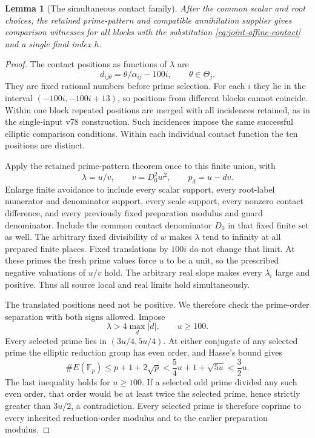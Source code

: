 \documentclass[11pt]{article}
\newtheorem{lemma}[theorem]{Lemma}
\begin{document}
\begin{lemma}[The simultaneous contact family]
\label{lem:joint-few-contacts}
After the common scalar and root choices, the retained prime-pattern
and compatible annihilation supplier gives comparison witnesses
for all blocks with the substitution
\eqref{eq:joint-affine-contact} and a single final index $h$.
\end{lemma}
\begin{proof}
The contact positions as functions of $\lambda$ are
\[
                d_{ij\theta}=\theta/\alpha_{ij}-100i,
                            \qquad \theta\in\Theta_j.
\]
They are fixed rational numbers before prime selection.  For each
$i$ they lie in the interval $(-100i,-100i+13)$, so positions from
different blocks cannot coincide.  Within one block repeated
positions are merged with all incidences retained, as in the
single-input v78 construction.  Such incidences impose the same
successful elliptic comparison conditions.  Within each individual
contact function the ten positions are distinct.

Apply the retained prime-pattern theorem once to this finite
union, with
\[
                  \lambda=u/v,\qquad v=D_0^2w^2,
                  \qquad p_d=u-dv.
\]
Enlarge finite avoidance to include every scalar support, every
root-label numerator and denominator support, every scale support,
every nonzero contact difference, and every previously fixed
preparation modulus and guard denominator.  Include the common
contact denominator $D_0$ in that fixed finite set as well.  The
arbitrary fixed divisibility of $w$ makes $\lambda$ tend to infinity at all prepared
finite places.  Fixed translations by $100i$ do not change that
limit.  At these primes the fresh prime values force $u$ to be a
unit, so the prescribed negative valuations of $u/v$ hold.
The arbitrary real slope makes every $\lambda_i$ large
and positive.  Thus all source local and real limits hold
simultaneously.

The translated positions need not be positive.  We therefore check
the prime-order separation with both signs allowed.  Impose
\[
                 \lambda>4\max_d|d|,\qquad u\ge100.
\]
Every selected prime lies in $(3u/4,5u/4)$.  At either conjugate
of any selected prime the elliptic reduction group has even order,
and Hasse's bound gives
\[
 \#E(\mathbb F_p)\le p+1+2\sqrt p
       <\frac54u+1+\sqrt{5u}<\frac32u.
\]
The last inequality holds for $u\ge100$.  If a selected odd prime
divided any such even order, that order would be at least twice
the selected prime, hence strictly greater than $3u/2$, a
contradiction.  Every selected prime is therefore coprime to
every inherited reduction-order modulus and to the earlier
preparation modulus.


\end{proof}
\end{document}
